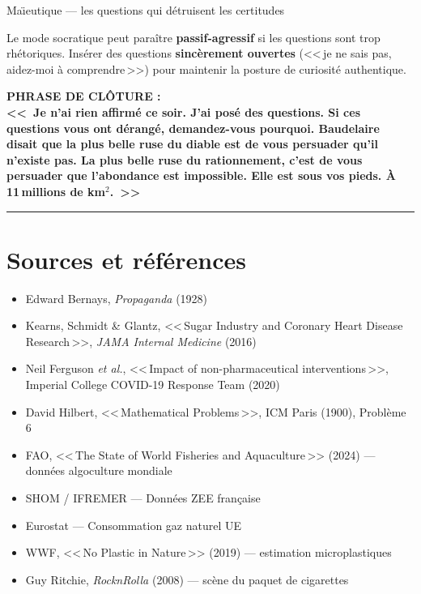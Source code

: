 \documentclass[a4paper,11pt]{article}
\begin{document}
\begin{fichebleu}{Ma\"{\i}eutique --- les questions qui d\'{e}truisent les certitudes}
\begin{anglemort}
Le mode socratique peut para\^{i}tre \textbf{passif-agressif} si les questions sont trop rh\'{e}toriques. Ins\'{e}rer des questions \textbf{sinc\`{e}rement ouvertes} (<<\,je ne sais pas, aidez-moi \`{a} comprendre\,>>) pour maintenir la posture de curiosit\'{e} authentique.
\end{anglemort}

\vspace{0.3cm}
\textbf{\color{ModeBleu}PHRASE DE CL\^{O}TURE :}\\
\textbf{\textcolor{ModeBleu}{<<~Je n'ai rien affirm\'{e} ce soir. J'ai pos\'{e} des questions. Si ces questions vous ont d\'{e}rang\'{e}, demandez-vous pourquoi. Baudelaire disait que la plus belle ruse du diable est de vous persuader qu'il n'existe pas. La plus belle ruse du rationnement, c'est de vous persuader que l'abondance est impossible. Elle est sous vos pieds. \`{A} 11\,millions de km$^2$.~>>}}

\end{fichebleu}

\vspace{1cm}

\begin{center}
\rule{12cm}{0.5pt}
\end{center}

\section*{Sources et r\'{e}f\'{e}rences}
\begin{itemize}[nosep, font=\small]
  \item Edward Bernays, \textit{Propaganda} (1928)
  \item Kearns, Schmidt \& Glantz, <<\,Sugar Industry and Coronary Heart Disease Research\,>>, \textit{JAMA Internal Medicine} (2016)
  \item Neil Ferguson \textit{et al.}, <<\,Impact of non-pharmaceutical interventions\,>>, Imperial College COVID-19 Response Team (2020)
  \item David Hilbert, <<\,Mathematical Problems\,>>, ICM Paris (1900), Probl\`{e}me 6
  \item FAO, <<\,The State of World Fisheries and Aquaculture\,>> (2024) --- donn\'{e}es algoculture mondiale
  \item SHOM / IFREMER --- Donn\'{e}es ZEE fran\c{c}aise
  \item Eurostat --- Consommation gaz naturel UE
  \item WWF, <<\,No Plastic in Nature\,>> (2019) --- estimation microplastiques
  \item Guy Ritchie, \textit{RocknRolla} (2008) --- sc\`{e}ne du paquet de cigarettes
\end{itemize}
\end{document}
